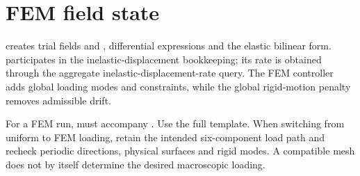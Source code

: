\section{FEM field state}
 creates trial fields  and , differential expressions and the elastic bilinear form.  participates in the inelastic-displacement bookkeeping; its rate is obtained through the aggregate inelastic-displacement-rate query. The FEM controller adds global loading modes and constraints, while the global rigid-motion penalty removes admissible drift.

For a FEM run,  must accompany . Use the full  template. When switching from uniform to FEM loading, retain the intended six-component load path and recheck periodic directions, physical surfaces and rigid modes. A compatible mesh does not by itself determine the desired macroscopic loading.
